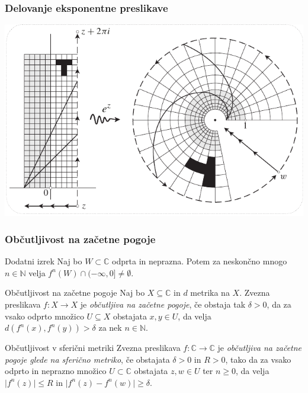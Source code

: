 \documentclass{beamer}
\newcommand{\NN}{\mathbb{N}}
\newcommand{\CC}{\mathbb{C}}
\theoremstyle{definition}
\theoremstyle{plain}
\begin{document}
\begin{frame}
  \frametitle{Delovanje eksponentne preslikave}
  \centering
  \includegraphics[width=\textwidth]{e.pdf} %
\end{frame}

\begin{frame}
  \frametitle{Občutljivost na začetne pogoje}

  \begin{block}{Dodatni izrek}
    Naj bo \(W \subset \CC\) odprta in neprazna. Potem za neskončno mnogo \(n \in \NN\) velja \(f^{n} (W) \cap (- \infty, 0] \neq \emptyset.\)
  \end{block}

  \begin{block}{Občutljivost na začetne pogoje}
    Naj bo \(X \subseteq \CC\) in \(d\) metrika na \(X\). Zvezna preslikava \(f \colon X \to X\) je \emph{občutljiva na začetne pogoje}, če obstaja tak \(\delta > 0\), da za vsako odprto množico \(U \subseteq X\) obstajata \(x, y \in U\), da velja \(d(f^n(x), f^n(y)) > \delta\) za nek \(n \in \NN\).
  \end{block}

  \begin{block}{Občutljivost v sferični metriki}
    Zvezna preslikava \(f \colon \CC \to \CC\) je \emph{občutljiva na začetne pogoje glede na sferično metriko}, če obstajata \(\delta > 0\) in \(R > 0\), tako da za vsako odprto in neprazno množico \(U \subset \CC\) obstajata \(z, w \in U\) ter \(n \geq 0\), da velja \(\vert f^n (z) \vert \leq R\) in \(\vert f^n (z) - f^n (w) \vert \geq \delta\).
  \end{block}

\end{frame}
\end{document}
